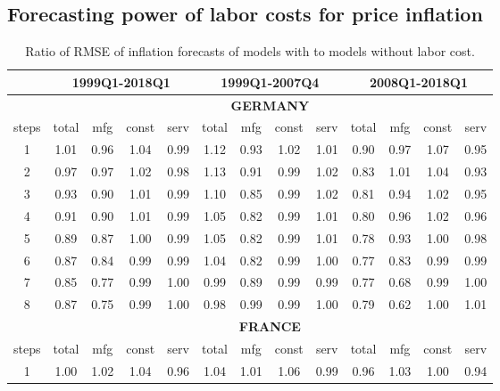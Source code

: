 \documentclass[11pt]{article}
\begin{document}
\begin{appendices}
\clearpage
\section{Forecasting power of labor costs for price inflation}
\label{AppendixForecast}
\begin{table}[!htbp]
\small
  \centering
  \caption{Ratio of RMSE of inflation forecasts of models with to models without labor cost.}
    \begin{tabular}{c|cccc|cccc|cccc}
    \toprule
    \multicolumn{1}{r}{} & \multicolumn{4}{c}{\textbf{\footnotesize{1999Q1-2018Q1}}} & \multicolumn{4}{c}{\textbf{\footnotesize{1999Q1-2007Q4}}} & \multicolumn{4}{c}{\textbf{\footnotesize{2008Q1-2018Q1}}} \\
    \midrule
    \multicolumn{1}{c}{} & \multicolumn{12}{c}{\textbf{\footnotesize{GERMANY}}} \\
    \midrule
    steps & total & mfg   & const & serv  & total & mfg   & const & serv  & total & mfg   & const & serv \\
    \midrule
    1     & 1.01  & 0.96  & 1.04  & 0.99  & 1.12  & 0.93  & 1.02  & 1.01  & 0.90  & 0.97  & 1.07  & 0.95 \\
    2     & 0.97  & 0.97  & 1.02  & 0.98  & 1.13  & 0.91  & 0.99  & 1.02  & 0.83  & 1.01  & 1.04  & 0.93 \\
    3     & 0.93  & 0.90  & 1.01  & 0.99  & 1.10  & 0.85  & 0.99  & 1.02  & 0.81  & 0.94  & 1.02  & 0.95 \\
    4     & 0.91  & 0.90  & 1.01  & 0.99  & 1.05  & 0.82  & 0.99  & 1.01  & 0.80  & 0.96  & 1.02  & 0.96 \\
    5     & 0.89  & 0.87  & 1.00  & 0.99  & 1.05  & 0.82  & 0.99  & 1.01  & 0.78  & 0.93  & 1.00  & 0.98 \\
    6     & 0.87  & 0.84  & 0.99  & 0.99  & 1.04  & 0.82  & 0.99  & 1.00  & 0.77  & 0.83  & 0.99  & 0.99 \\
    7     & 0.85  & 0.77  & 0.99  & 1.00  & 0.99  & 0.89  & 0.99  & 0.99  & 0.77  & 0.68  & 0.99  & 1.00 \\
    8     & 0.87  & 0.75  & 0.99  & 1.00  & 0.98  & 0.99  & 0.99  & 1.00  & 0.79  & 0.62  & 1.00  & 1.01 \\
    \midrule
    \multicolumn{1}{c}{} & \multicolumn{12}{c}{\textbf{\footnotesize{FRANCE}}} \\
    \midrule
    steps & total & mfg   & const & serv  & total & mfg   & const & serv  & total & mfg   & const & serv \\
    \midrule
    1     & 1.00  & 1.02  & 1.04  & 0.96  & 1.04  & 1.01  & 1.06  & 0.99  & 0.96  & 1.03  & 1.00  & 0.94 \\

\end{tabular}
\end{table}
\end{appendices}
\end{document}
